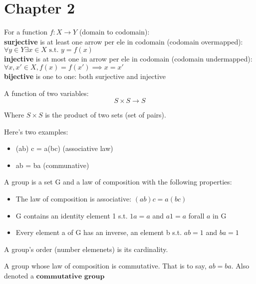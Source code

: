 \section{Chapter 2}

\begin{definition}
  For a function $f:X\rightarrow Y$ (domain to codomain): \\
  \textbf{surjective} is at least one arrow per ele in codomain (codomain overmapped): $\forall y \in Y \exists x \in X \text{ s.t. } y = f(x)$\\
  \textbf{injective} is at most one in arrow per ele in codomain (codomain undermapped): $\forall x, x' \in X,f(x) = f(x')\implies x = x'$\\
  \textbf{bijective} is one to one: both surjective and injective

\end{definition}

\begin{definition}
  A function of two variables:
  \[S \times S \rightarrow S\]

  Where $S \times S$ is the product of two sets (set of pairs).
\end{definition}

\begin{definition}
  Here's two examples:

  \begin{itemize}
      \item (ab) c = a(bc) (associative law)
      \item ab = ba (communative)
  \end{itemize}
\end{definition}

\begin{definition}
  A group is a set G and a law of composition with the following properties:
  \begin{itemize}
    \item The law of composition is associative: $(ab)c = a(bc)$
    \item G contains an identity element 1 s.t. $1a = a$ and  $ a1 = a$ forall $a$ in G
    \item Every element a of G has an inverse, an element b s.t. $ab=1$ and  $ba = 1$
  \end{itemize}
  A group's order (number elemenets) is its cardinality.
\end{definition}
\begin{definition}
  A group whose law of composition is commutative. That is to say, $ab = ba$.
  Also denoted a $\textbf{commutative group}$
\end{definition}

